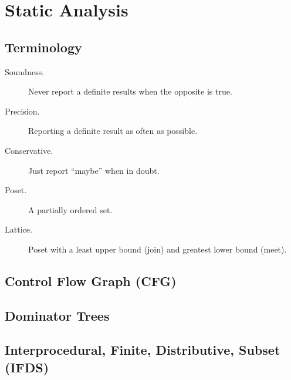 \chapter{Static Analysis}

\section{Terminology}

\begin{description}
  \item[Soundness.] Never report a definite results when the opposite is true.
  \item[Precision.] Reporting a definite result as often as possible.
  \item[Conservative.] Just report ``maybe'' when in doubt.
  \item[Poset.] A partially ordered set.
  \item[Lattice.] Poset with a least upper bound (join) and greatest lower bound
                  (meet).
\end{description}

\section{Control Flow Graph (CFG)}


\section{Dominator Trees}


\section{Interprocedural, Finite, Distributive, Subset (IFDS)}
